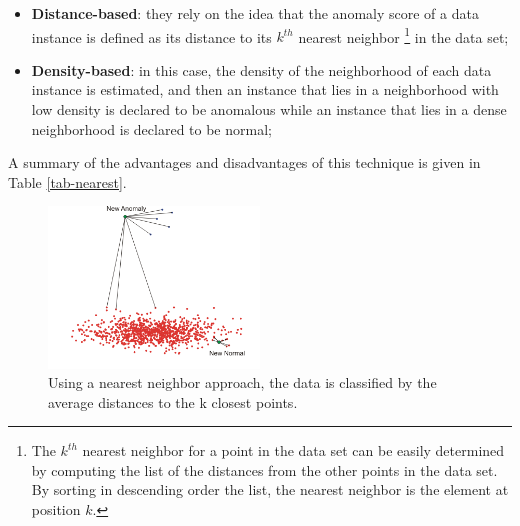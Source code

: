 \documentclass[12pt,a4paper,cucitura]{toptesi}
\begin{document}
\begin{itemize}
\item \textbf{Distance-based}: they rely on the idea that the anomaly score of a data instance is defined as its distance to its $k^{th}$ nearest neighbor \footnote{The $k^{th}$ nearest neighbor for a point in the data set can be easily determined by computing the list of the distances from the other points in the data set. By sorting in descending order the list, the nearest neighbor is the element at position $k$.} in the data set;
\item \textbf{Density-based}: in this case, the density of the neighborhood of each data instance is estimated, and then an instance that lies in a neighborhood with low density is declared to be anomalous while an instance that lies in a dense neighborhood is declared to be normal;
\end{itemize}

A summary of the advantages and disadvantages of this technique is given in Table \ref{tab-nearest}.

\begin{figure}
\centering
\includegraphics[width=0.5\textwidth]{points.png}
\caption[Nearest neighbor example]{Using a nearest neighbor approach, the data is classified by the average distances to the k closest points.}
\end{figure}
\end{document}
